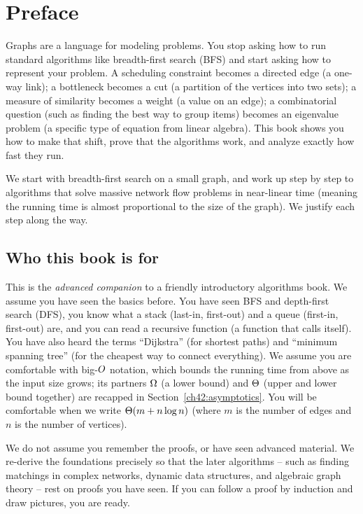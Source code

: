 \chapter*{Preface}

Graphs are a language for modeling problems. You stop asking how to run standard algorithms like breadth-first search (BFS) and start asking how to represent your problem. A scheduling constraint becomes a directed edge (a one-way link); a bottleneck becomes a cut (a partition of the vertices into two sets); a measure of similarity becomes a weight (a value on an edge); a combinatorial question (such as finding the best way to group items) becomes an eigenvalue problem (a specific type of equation from linear algebra). This book shows you how to make that shift, prove that the algorithms work, and analyze exactly how fast they run.

We start with breadth-first search on a small graph, and work up step by step to algorithms that solve massive network flow problems in near-linear time (meaning the running time is almost proportional to the size of the graph). We justify each step along the way.

\chapterline

\section*{Who this book is for}

This is the \emph{advanced companion} to a friendly introductory algorithms book.
We assume you have seen the basics before. You have seen BFS and depth-first search (DFS), you know what a stack (last-in, first-out) and a queue (first-in, first-out) are, and you can read a recursive function (a function that calls itself). You have also heard the terms ``Dijkstra'' (for shortest paths) and ``minimum spanning tree'' (for the cheapest way to connect everything). We assume you are comfortable with big-$O$ notation, which bounds the running time from above as the input size grows; its partners $\Omega$ (a lower bound) and $\Theta$ (upper and lower bound together) are recapped in Section~\ref{ch42:asymptotics}. You will be comfortable when we write $\Theta(m + n\log n)$ (where $m$ is the number of edges and $n$ is the number of vertices).

We do not assume you remember the proofs, or have seen advanced material. We re-derive the foundations precisely so that the later algorithms -- such as finding matchings in complex networks, dynamic data structures, and algebraic graph theory -- rest on proofs you have seen. If you can follow a proof by induction and draw pictures, you are ready.


